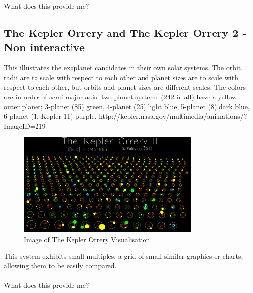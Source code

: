 \documentclass[11pt
              , a4paper
              , twoside
              , openright
              ]{report}
\begin{document}
What does this provide me?

\subsection{The Kepler Orrery and The Kepler Orrery 2 - Non interactive}
This illustrates the exoplanet candidates in their own solar systems. The orbit radii are to scale with respect to each other and planet sizes are to scale with respect to each other, but orbits and planet sizes are different scales. The colors are in order of semi-major axis: two-planet systems (242 in all) have a yellow outer planet; 3-planet (85) green, 4-planet (25) light blue, 5-planet (8) dark blue, 6-planet (1, Kepler-11) purple. http://kepler.nasa.gov/multimedia/animations/?ImageID=219
\begin{figure}[h!]
  \centering
      \includegraphics[width=0.8\textwidth]{images/orrery.jpg}
  \caption{Image of The Kepler Orrery Visualisation}
\end{figure}
This system exhibits small multiples, a grid of small similar graphics or charts, allowing them to be easily compared.
\\\\
What does this provide me?
\end{document}
